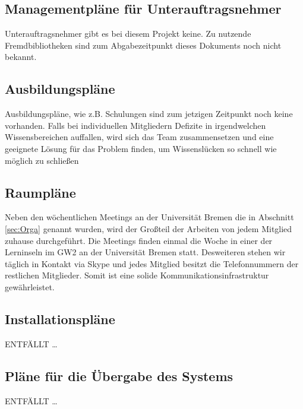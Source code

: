 \documentclass[fontsize=12pt,paper=a4,twoside]{scrartcl}
\begin{document}
\subsection{Managementpläne für Unterauftragsnehmer}
Unterauftragsnehmer gibt es bei diesem Projekt keine. Zu nutzende Fremdbibliotheken sind zum Abgabezeitpunkt dieses Dokuments noch nicht bekannt.

\subsection{Ausbildungspläne}

Ausbildungspläne, wie z.B. Schulungen sind zum jetzigen Zeitpunkt noch keine vorhanden. Falls bei individuellen Mitgliedern Defizite in irgendwelchen Wissensbereichen auffallen, wird sich das Team zusammensetzen und eine geeignete Lösung für das Problem finden, um Wissenslücken so schnell wie möglich zu schließen

\subsection{Raumpläne}

Neben den wöchentlichen Meetings an der Universität Bremen die in Abschnitt \ref{sec:Orga} genannt wurden, wird der Großteil der Arbeiten von jedem Mitglied zuhause durchgeführt. Die Meetings finden einmal die Woche in einer der Lerninseln im GW2 an der Universität Bremen statt. Desweiteren stehen wir täglich in Kontakt via Skype und jedes Mitglied besitzt die Telefonnummern der restlichen Mitglieder. Somit ist eine solide Kommunikationsinfrastruktur gewährleistet.

\subsection{Installationspläne}
ENTFÄLLT
\dots

\subsection{Pläne für die Übergabe des Systems}
ENTFÄLLT
\dots
\end{document}

